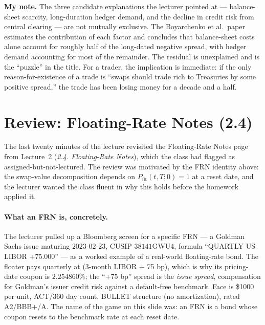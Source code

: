 \begin{checkpoint}
\textbf{My note.} The three candidate explanations the lecturer pointed at
--- balance-sheet scarcity, long-duration hedger demand, and the decline
in credit risk from central clearing --- are not mutually exclusive. The
Boyarchenko et al.\ paper estimates the contribution of each factor and
concludes that balance-sheet costs alone account for roughly half of the
long-dated negative spread, with hedger demand accounting for most of
the remainder. The residual is unexplained and is the ``puzzle'' in the
title. For a trader, the implication is immediate: if the only
reason-for-existence of a trade is ``swaps should trade rich to
Treasuries by some positive spread,'' the trade has been losing money for
a decade and a half.
\end{checkpoint}

\section{Review: Floating-Rate Notes (2.4)}\label{L4-sec:frn}

The last twenty minutes of the lecture revisited the Floating-Rate Notes
page from Lecture~2 (\emph{2.4. Floating-Rate Notes}), which the class
had flagged as assigned-but-not-lectured. The review was motivated by the
FRN identity above: the swap-value decomposition depends on
$P_{\text{flt}}(t,T;0) = 1$ at a reset date, and the lecturer wanted the
class fluent in why this holds before the homework applied it.

\paragraph{What an FRN is, concretely.} The lecturer pulled up a Bloomberg
screen for a specific FRN --- a Goldman Sachs issue maturing
$2023$-$02$-$23$, CUSIP $38141\mathrm{GWU4}$, formula ``QUARTLY US LIBOR
+75.000'' --- as a worked example of a real-world floating-rate bond. The
floater pays quarterly at (3-month LIBOR + 75 bp), which is why its
pricing-date coupon is $2.254860\%$; the ``+75 bp'' spread is the
\emph{issue spread}, compensation for Goldman's issuer credit risk
against a default-free benchmark. Face is \$1000 per unit, ACT/360 day
count, BULLET structure (no amortization), rated A2/BBB+/A. The name of
the game on this slide was: an FRN is a bond whose coupon resets to the
benchmark rate at each reset date.

